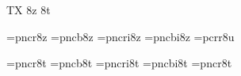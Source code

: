 
\ifx\ffdecl\undefined  \fi

\ffdecl [NewCentury] {\rm \bf \it \bi} {\caps{\rm\bf}} {} {TX} {8z 8t}

\def\caps{\ffvars{r}{b}{!}{!}\ffsetV{caps}{c}\ffsetX} 
\def\nocaps{\ffsetX} 
\nocaps\relax %
\def\ffwarning#1{\ffmessage{FONT warning: NewCentury - \string\caps#1 unavailable}}

\ismacro{}\ifttrue
   \font\tenrm=pncr8z   \sizespec
   \font\tenbf=pncb8z   \sizespec
   \font\tenit=pncri8z  \sizespec
   \font\tenbi=pncbi8z  \sizespec
   \font\tentt=pcrr8u   \sizespec
   \let\tensl=\tenit

   \def\ffnamegen{pnc\ffvarV\capsV 8z}

   
\fi

\ismacro{}\ifttrue
   \font\tenrm=pncr8t   \sizespec
   \font\tenbf=pncb8t   \sizespec
   \font\tenit=pncri8t  \sizespec
   \font\tenbi=pncbi8t  \sizespec
   \font\tentt=pncr8t   \sizespec
   \let\tensl=\tenit

   \def\ffnamegen{pnc\ffvarV\capsV 8t}
\fi

\tenrm

\let\setsimplemath=\relax %

\def\ncTeX{T\kern-.1667em\lower.5ex\hbox{E}\kern-.125emX}
\ifx\origTeX\undefined \let\origTeX=\TeX \fi
\let\TeX=\ncTeX

\ifx\loadmathfonts\relax \endinput \fi
\ifx\mathpreloaded X\else  \fi                     



